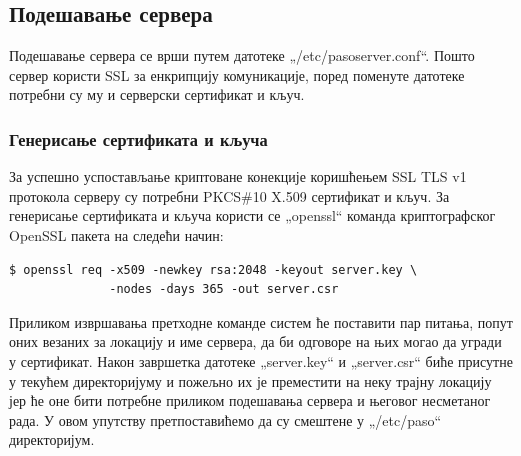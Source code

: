 \documentclass[a4paper, 12pt, diplomski]{etfcyr}
\def\quote#1{„#1“}
\begin{document}
				\subsection{Подешавање сервера}
					\begin{justify}
						Подешавање сервера се врши путем датотеке \quote{/etc/pasoserver.conf}. Пошто сервер користи SSL за енкрипцију комуникације, поред поменуте датотеке потребни су му и серверски сертификат и кључ.
					\end{justify}

					\subsubsection*{Генерисање сертификата и кључа}
						\begin{justify}
							За успешно успостављање криптоване конекције коришћењем SSL TLS v1 протокола серверу су потребни PKCS\#10 X.509 сертификат и кључ. За генерисање сертификата и кључа користи се \quote{openssl} команда криптографског OpenSSL пакета на следећи начин:
							\begin{footnotesize}
								\begin{verbatim}
$ openssl req -x509 -newkey rsa:2048 -keyout server.key \
              -nodes -days 365 -out server.csr
								\end{verbatim}
							\end{footnotesize}
							Приликом извршавања претходне команде систем ће поставити пар питања, попут оних везаних за локацију и име сервера, да би одговоре на њих могао да угради у сертификат. Након завршетка датотеке \quote{server.key} и \quote{server.csr} биће присутне у текућем директоријуму и пожељно их је преместити на неку трајну локацију јер ће оне бити потребне приликом подешавања сервера и његовог несметаног рада. У овом упутству претпоставићемо да су смештене у \quote{/etc/paso} директоријум.
						\end{justify}

					\newpage
\end{document}
